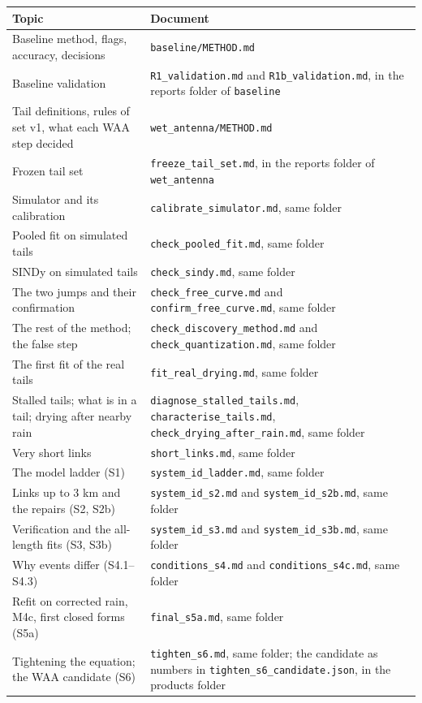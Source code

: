 \documentclass[11pt,a4paper]{article}
\newcommand{\code}[1]{\texttt{#1}}
\begin{document}
{\small
\begin{tabularx}{\linewidth}{@{}l Y@{}}
\toprule
\textbf{Topic} & \textbf{Document} \\
\midrule
Baseline method, flags, accuracy, decisions & \code{baseline/METHOD.md} \\
Baseline validation & \code{R1\_validation.md} and \code{R1b\_validation.md}, in the reports folder of \code{baseline} \\
Tail definitions, rules of set v1, what each WAA step decided & \code{wet\_antenna/METHOD.md} \\
Frozen tail set & \code{freeze\_tail\_set.md}, in the reports folder of \code{wet\_antenna} \\
Simulator and its calibration & \code{calibrate\_simulator.md}, same folder \\
Pooled fit on simulated tails & \code{check\_pooled\_fit.md}, same folder \\
SINDy on simulated tails & \code{check\_sindy.md}, same folder \\
The two jumps and their confirmation & \code{check\_free\_curve.md} and \code{confirm\_free\_curve.md}, same folder \\
The rest of the method; the false step & \code{check\_discovery\_method.md} and \code{check\_quantization.md}, same folder \\
The first fit of the real tails & \code{fit\_real\_drying.md}, same folder \\
Stalled tails; what is in a tail; drying after nearby rain & \code{diagnose\_stalled\_tails.md}, \code{characterise\_tails.md}, \code{check\_drying\_after\_rain.md}, same folder \\
Very short links & \code{short\_links.md}, same folder \\
The model ladder (S1) & \code{system\_id\_ladder.md}, same folder \\
Links up to 3 km and the repairs (S2, S2b) & \code{system\_id\_s2.md} and \code{system\_id\_s2b.md}, same folder \\
Verification and the all-length fits (S3, S3b) & \code{system\_id\_s3.md} and \code{system\_id\_s3b.md}, same folder \\
Why events differ (S4.1--S4.3) & \code{conditions\_s4.md} and \code{conditions\_s4c.md}, same folder \\
Refit on corrected rain, M4c, first closed forms (S5a) & \code{final\_s5a.md}, same folder \\
Tightening the equation; the WAA candidate (S6) & \code{tighten\_s6.md}, same folder; the candidate as numbers in \code{tighten\_s6\_candidate.json}, in the products folder \\

\end{tabularx}}
\end{document}
